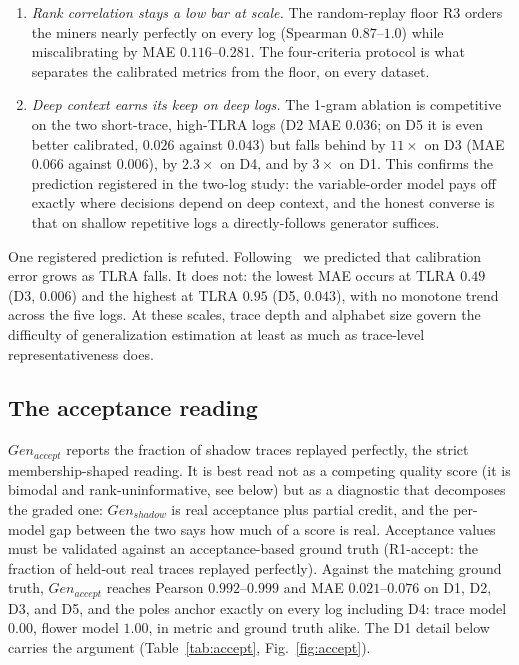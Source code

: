 \documentclass[runningheads]{llncs}
\newcommand{\chg}[1]{\textcolor{chgblue}{#1}}
\newcommand{\genshadow}{\ensuremath{\mathit{Gen}_{\mathit{shadow}}}}
\newcommand{\genaccept}{\ensuremath{\mathit{Gen}_{\mathit{accept}}}}
\begin{document}
{\begin{enumerate}
  \item \emph{Rank correlation stays a low bar at scale.} The random-replay floor R3 orders the miners nearly perfectly on every log (Spearman $0.87$--$1.0$) while miscalibrating by MAE $0.116$--$0.281$. The four-criteria protocol is what separates the calibrated metrics from the floor, on every dataset.
  \item \emph{Deep context earns its keep on deep logs.} The 1-gram ablation is competitive on the two short-trace, high-TLRA logs (D2 MAE $0.036$; on D5 it is even better calibrated, $0.026$ against $0.043$) but falls behind by $11\times$ on D3 (MAE $0.066$ against $0.006$), by $2.3\times$ on D4, and by $3\times$ on D1. This confirms the prediction registered in the two-log study: the variable-order model pays off exactly where decisions depend on deep context, and the honest converse is that on shallow repetitive logs a directly-follows generator suffices.
\end{enumerate}

One registered prediction is refuted. Following~\cite{karunaratne2024representativeness} we predicted that calibration error grows as TLRA falls. It does not: the lowest MAE occurs at TLRA $0.49$ (D3, $0.006$) and the highest at TLRA $0.95$ (D5, $0.043$), with no monotone trend across the five logs. At these scales, trace depth and alphabet size govern the difficulty of generalization estimation at least as much as trace-level representativeness does.
}

\subsection{The acceptance reading}
\label{sec:eval:accept}
\genaccept{} reports the fraction of shadow traces replayed perfectly, the strict membership-shaped reading. It is best read not as a competing quality score (it is bimodal and rank-uninformative, see below) but as a diagnostic that decomposes the graded one: $\genshadow$ is real acceptance plus partial credit, and the per-model gap between the two says how much of a score is real. Acceptance values must be validated against an acceptance-based ground truth (R1-accept: the fraction of held-out real traces replayed perfectly). \chg{Against the matching ground truth, \genaccept{} reaches Pearson $0.992$--$0.999$ and MAE $0.021$--$0.076$ on D1, D2, D3, and D5, and the poles anchor exactly on every log including D4: trace model $0.00$, flower model $1.00$, in metric and ground truth alike.} The D1 detail below carries the argument (Table~\ref{tab:accept}, Fig.~\ref{fig:accept}).
\end{document}
